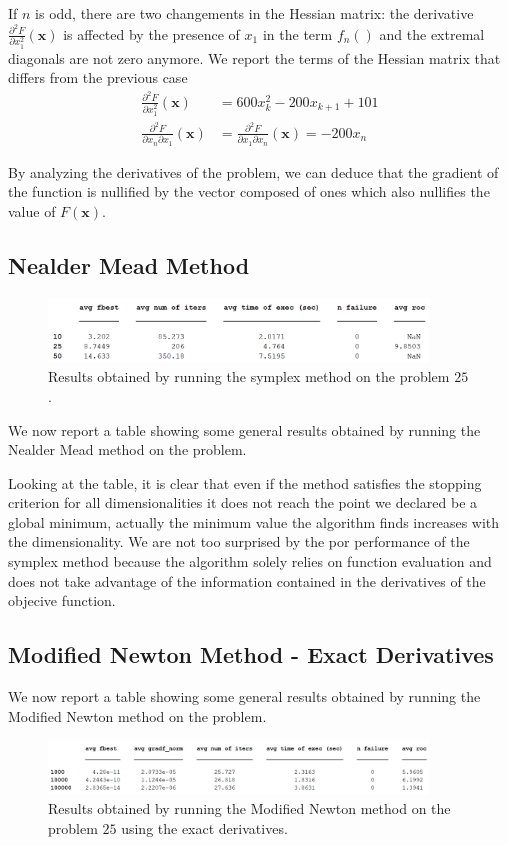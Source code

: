 If $n$ is odd, there are two changements in the Hessian matrix: the derivative $\frac{\partial^2 F}{\partial x_1^2} (\mathbf{x}) $ is affected by the presence of $x_1$ in the term $f_n()$ and the extremal diagonals are not zero anymore. We report the terms of the Hessian matrix that differs from the previous case
\begin{align*}
    \frac{\partial^2 F}{\partial x_1^2}  (\mathbf{x}) &= 600x_k^2 - 200x_{k+1} + 101 \\
    \frac{\partial^2 F}{\partial x_n \partial x_1} (\mathbf{x}) &= \frac{\partial^2 F}{\partial x_1 \partial x_n} (\mathbf{x}) = -200x_n
\end{align*}


By analyzing the derivatives of the problem, we can deduce that the gradient of the function is nullified by the vector composed of ones which also nullifies the value of $F(\mathbf{x})$. 


 
\medskip
\subsection*{Nealder Mead Method}
\begin{figure}[htbp]
    \centering
    \includegraphics[width = 0.9\textwidth]{img/pb25_SX_table.png}
    \caption{Results obtained by running the symplex method on the problem $25$.}
\end{figure}
We now report a table showing some general results obtained by running the Nealder Mead method on the problem.

Looking at the table, it is clear that even if the method satisfies the stopping criterion for all dimensionalities it does not reach the point we declared be a global minimum, actually the minimum value the algorithm finds increases with the dimensionality.
We are not too surprised by the por performance of the symplex method because the algorithm solely relies on function evaluation and does not take advantage of the information contained in the derivatives of the objecive function.


\medskip
\subsection*{Modified Newton Method - Exact Derivatives}
We now report a table showing some general results obtained by running the Modified Newton method on the problem.
\begin{figure}[htbp]
    \centering
    \includegraphics[width = 0.9\textwidth]{img/pb25_MN_table.png}
    \caption{Results obtained by running the Modified Newton method on the problem $25$ using the exact derivatives.}
\end{figure}

